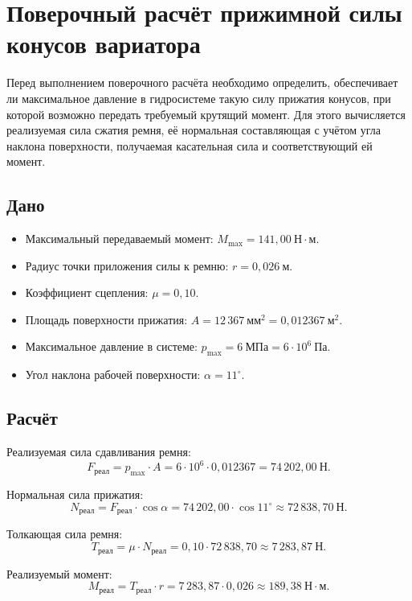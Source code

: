 \chapter{Поверочный расчёт прижимной силы конусов вариатора}

Перед выполнением поверочного расчёта необходимо определить, обеспечивает ли максимальное давление в гидросистеме такую силу прижатия конусов, при которой возможно передать требуемый крутящий момент. Для этого вычисляется реализуемая сила сжатия ремня, её нормальная составляющая с учётом угла наклона поверхности, получаемая касательная сила и соответствующий ей момент.

\section*{Дано}
\begin{itemize}
  \item Максимальный передаваемый момент: $M_{\max}=141{,}00\ \text{Н}\cdot\text{м}$.
  \item Радиус точки приложения силы к ремню: $r=0{,}026\ \text{м}$.
  \item Коэффициент сцепления: $\mu=0{,}10$.
  \item Площадь поверхности прижатия: $A=12\,367\ \text{мм}^2 = 0{,}012367\ \text{м}^2$.
  \item Максимальное давление в системе: $p_{\max}=6\ \text{МПа}=6\cdot 10^{6}\ \text{Па}$.
  \item Угол наклона рабочей поверхности: $\alpha=11^\circ$.
\end{itemize}

\section*{Расчёт}

Реализуемая сила сдавливания ремня:
\[
F_{\text{реал}} = p_{\max}\cdot A
= 6\cdot 10^{6}\cdot 0{,}012367
= 74\,202{,}00\ \text{Н}.
\]

Нормальная сила прижатия:
\[
N_{\text{реал}} = F_{\text{реал}}\cdot \cos\alpha
= 74\,202{,}00\cdot \cos 11^\circ
\approx 72\,838{,}70\ \text{Н}.
\]

Толкающая сила ремня:
\[
T_{\text{реал}} = \mu\cdot N_{\text{реал}}
= 0{,}10\cdot 72\,838{,}70
\approx 7\,283{,}87\ \text{Н}.
\]

Реализуемый момент:
\[
M_{\text{реал}} = T_{\text{реал}}\cdot r
= 7\,283{,}87\cdot 0{,}026
\approx 189{,}38\ \text{Н}\cdot\text{м}.
\]

